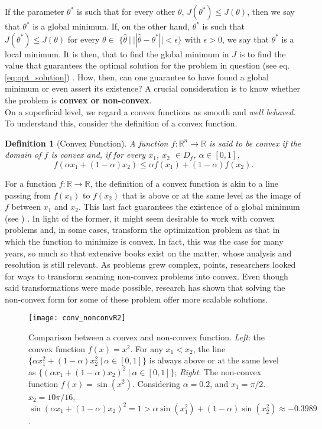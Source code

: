 \documentclass{article}
\newtheorem{definition}{Definition}
\newcommand{\rnums}{\mathbb{R}}
\begin{document}
	If the parameter $\theta^*$ is such that for every other $\theta$, $J(\theta^*) \leq J(\theta)$, then we say that $\theta^*$ is a global minimum. If, on the other hand, $\theta^*$ is such that $J(\theta^*) \leq J(\theta)$ for every $\theta \in$ $\{\hat\theta \ | \  ||\hat\theta - \theta^*|| < \epsilon\}$ with $\epsilon > 0$, we say that $\theta^*$ is a local minimum. It is then, that to find the global minimum in $J$ is to find the value that guarantees the optimal solution for the problem in question (see eq. \ref{eq:opt_solution}) . How, then, can one guarantee to have found a global minimum or even assert its existence? A crucial consideration is to know whether the problem is \textbf{convex or non-convex}.\\
		
	On a superficial level, we regard a convex functions as smooth and \textit{well behaved}. To understand this, consider the definition of a convex function.
	
	\begin{definition}[Convex Function]
		A function $f:\rnums^n \to \rnums$ is said to be convex if the domain of $f$ is convex and, if for every $x_1$, $x_2$ $\in D_{f}$, $\alpha \in [0, 1]$,
		\begin{equation}
 			f(\alpha x_1 + (1-\alpha)x_2) \leq \alpha f(x_1) + (1 - \alpha) f(x_2).
		\end{equation}
	\end{definition}
	
	For a function $f: \rnums \to \rnums$, the definition of a convex function is akin to a line passing from $f(x_1)$ to $f(x_2)$ that is above or at the same level as the image of $f$ between $x_1$ and $x_2$. This last fact guarantees the existence of a global minimum (see \cite{boyd}) . In light of the former, it might seem desirable to work with convex problems and, in some cases, transform the optimization problem as that in which the function to minimize is convex. In fact, this was the case for many years, so much so that extensive books exist on the matter, whose analysis and resolution is still relevant. As problems grew complex, \cite{Jain-Kar} points, researchers looked for ways to transform seaming non-convex problems into convex. Even though said transformations were made possible, research has shown that solving the non-convex form for some of these problem offer more scalable solutions.\\
	
	\begin{figure}
		\centering
		\texttt{[image: conv\_nonconvR2]}
		\caption{Comparison between a convex and non-convex function. \textit{Left}: the convex function $f(x) = x^2$. For any $x_1 < x_2$, the line $\{\alpha x_1^2  + (1 - \alpha) x_2^2 \ | \ \alpha \in [0,1]\}$ is always above or at the same level as $\{(\alpha x_1  + (1 - \alpha) x_2)^2 \ | \ \alpha \in [0,1]\}$; \textit{Right}: The non-convex function $f(x) = \sin(x^2)$. Considering $\alpha = 0.2$, and $x_1 = \pi / 2$. $x_2 = 10 \pi / 16$, $\sin(\alpha x_1 + (1 - \alpha) x_2)^2 = 1 > \alpha \sin(x_1 ^ 2) + (1 - \alpha) \sin(x_2^2) \approx -0.3989$.}
		\label{fig:conv_nonconvr2}
	\end{figure}
		
\end{document}
